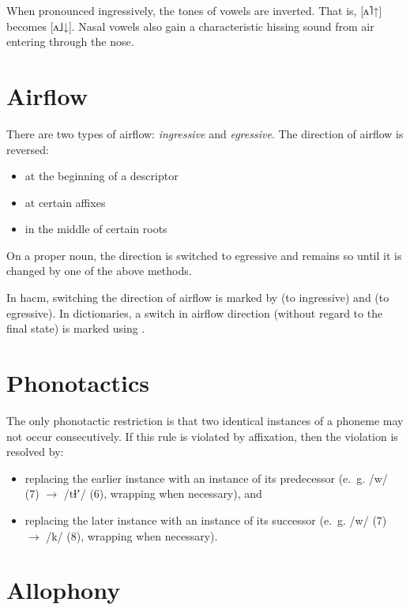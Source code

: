 \documentclass{book}
\begin{document}
When pronounced ingressively, the tones of vowels are inverted. That is, [ʌ˥↑] becomes [ʌ˩↓]. Nasal vowels also gain a characteristic hissing sound from air entering through the nose.

\section{Airflow}


There are two types of airflow: \emph{ingressive} and \emph{egressive}. The direction of airflow is reversed:

\begin{itemize}
  \item at the beginning of a descriptor
  \item at certain affixes
  \item in the middle of certain roots
\end{itemize}

On a proper noun, the direction is switched to egressive and remains so until it is changed by one of the above methods.

In hacm, switching the direction of airflow is marked by \hortho{/} (to ingressive) and \hortho{\bs} (to egressive). In dictionaries, a switch in airflow direction (without regard to the final state) is marked using \hortho{>}.

\section{Phonotactics}

The only phonotactic restriction is that two identical instances of a phoneme may not occur consecutively. If this rule is violated by affixation, then the violation is resolved by:

\begin{itemize}
  \item replacing the earlier instance with an instance of its predecessor (e.~g. /w/ (7) $\rightarrow$ /tɬʼ/ (6), wrapping when necessary), and
  \item replacing the later instance with an instance of its successor (e.~g. /w/ (7) $\rightarrow$ /k/ (8), wrapping when necessary).
\end{itemize}

\section{Allophony}
\end{document}
